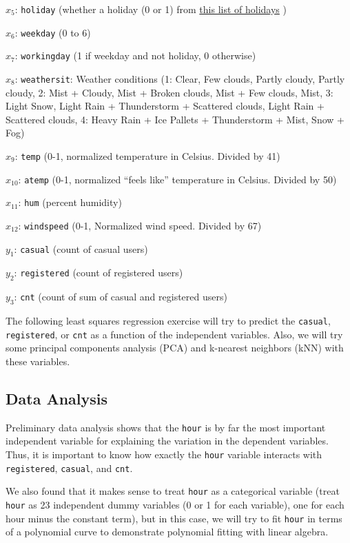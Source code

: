 \documentclass[
]{article}
\begin{document}
\(x_{5}\): \texttt{holiday} (whether a holiday (0 or 1) from
\color{blue}
\href{https://dchrc.dc.gov/page/holiday-schedule}{this list of holidays}
\color{black} )

\(x_{6}\): \texttt{weekday} (0 to 6)

\(x_{7}\): \texttt{workingday} (1 if weekday and not holiday, 0
otherwise)

\(x_{8}\): \texttt{weathersit}: Weather conditions (1: Clear, Few
clouds, Partly cloudy, Partly cloudy, 2: Mist + Cloudy, Mist + Broken
clouds, Mist + Few clouds, Mist, 3: Light Snow, Light Rain +
Thunderstorm + Scattered clouds, Light Rain + Scattered clouds, 4: Heavy
Rain + Ice Pallets + Thunderstorm + Mist, Snow + Fog)

\(x_{9}\): \texttt{temp} (0-1, normalized temperature in Celsius.
Divided by 41)

\(x_{10}\): \texttt{atemp} (0-1, normalized ``feels like'' temperature
in Celsius. Divided by 50)

\(x_{11}\): \texttt{hum} (percent humidity)

\(x_{12}\): \texttt{windspeed} (0-1, Normalized wind speed. Divided by
67)

\(y_{1}\): \texttt{casual} (count of casual users)

\(y_{2}\): \texttt{registered} (count of registered users)

\(y_{3}\): \texttt{cnt} (count of sum of casual and registered users)

The following least squares regression exercise will try to predict the
\texttt{casual}, \texttt{registered}, or \texttt{cnt} as a function of
the independent variables. Also, we will try some principal components
analysis (PCA) and k-nearest neighbors (kNN) with these variables.

\hypertarget{data-analysis}{%
\subsection{Data Analysis}\label{data-analysis}}

Preliminary data analysis shows that the \texttt{hour} is by far the
most important independent variable for explaining the variation in the
dependent variables. Thus, it is important to know how exactly the
\texttt{hour} variable interacts with \texttt{registered},
\texttt{casual}, and \texttt{cnt}.

We also found that it makes sense to treat \texttt{hour} as a
categorical variable (treat \texttt{hour} as 23 independent dummy
variables (0 or 1 for each variable), one for each hour minus the
constant term), but in this case, we will try to fit \texttt{hour} in
terms of a polynomial curve to demonstrate polynomial fitting with
linear algebra.
\end{document}
